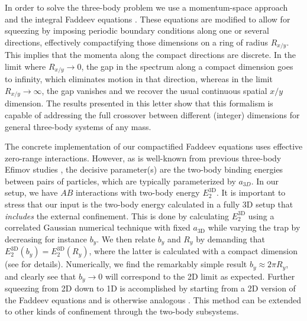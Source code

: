 \documentclass[twocolumn,showpacs,aps,prl,10pt]{revtex4}
\begin{document}
In order to solve the three-body problem we use a momentum-space
approach and the integral Faddeev equations
\cite{adh95a,adh95b,fre11}.  These equations are modified to allow for
squeezing by imposing periodic boundary conditions along one or
several directions, effectively compactifying those dimensions on a
ring of radius $R_{x/y}$. This implies that the momenta along the
compact directions are discrete. In the limit where $R_{x/y}\to 0$,
the gap in the spectrum along a compact dimension goes to infinity,
which eliminates motion in that direction, whereas in the limit
$R_{x/y}\to\infty$, the gap vanishes and we recover the usual 
continuous spatial $x/y$ dimension. 
The results presented in this letter show
that this formalism is capable of addressing the full crossover
between different (integer) dimensions for general three-body systems
of any mass.

The concrete implementation of our compactified Faddeev equations uses
effective zero-range interactions. However, as is well-known from
previous three-body Efimov studies \cite{efi70}, the decisive
parameter(s) are the two-body binding energies between pairs of
particles, which are typically parameterized by $a_{3D}$. 
In our setup, we have $AB$ interactions with two-body
energy $E_{2}^{\textrm{3D}}$.  It is important to stress that our
input is the two-body energy calculated in a fully 3D setup that 
{\it includes} the external confinement. This is done by calculating
$E_{2}^{\textrm{3D}}$ using a correlated Gaussian
numerical technique \cite{mitroy2013} with fixed $a_\textrm{3D}$ while varying the
trap by decreasing for instance $b_y$. We then relate $b_y$ and
$R_y$ by demanding that
$E_{2}^{\textrm{3D}}(b_y)=E_{2}^{\textrm{3D}}(R_y)$, where the latter
is calculated with a compact dimension (see \cite{supmat} for
details).  Numerically, we find the remarkably simple result $b_y
\approx 2\pi R_y$, and clearly see that $b_y\to 0$ will correspond to
the 2D limit as expected.  Further squeezing from 2D down to 1D is
accomplished by starting from a 2D version of the Faddeev equations
\cite{bel11,bel12,bel13b} and is otherwise analogous \cite{supmat}.  This
method can be extended to other kinds of confinement through the two-body
subsystems.
\end{document}
